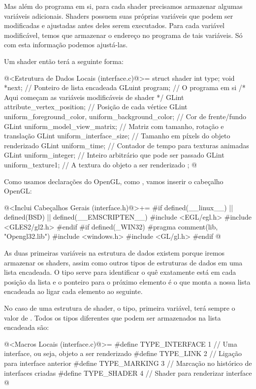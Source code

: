 Mas além do programa em si, para cada shader precisamos armazenar
algumas variáveis adicionais. Shaders possuem suas próprias variáveis
que podem ser modificadas e ajustadas antes deles serem
executados. Para cada variável modificável, temos que armazenar o
endereço no programa de tais variáveis. Só com esta informação podemos
ajustá-las.

Um shader então terá a seguinte forma:

\iniciocodigo
@<Estrutura de Dados Locais (interface.c)@>=
struct shader {
  int type;
  void *next; // Ponteiro de lista encadeada
  GLuint program; // O programa em si
  /* Aqui começam as variáveis modificáveis de shader */
  GLint attribute_vertex_position; // Posição de cada vértice
  GLint uniform_foreground_color, uniform_background_color; // Cor de frente/fundo
  GLint uniform_model_view_matrix; // Matriz com tamanho, rotação e translação
  GLint uniform_interface_size; // Tamanho em píxels do objeto renderizado
  GLint uniform_time; // Contador de tempo para texturas animadas
  GLint uniform_integer; // Inteiro arbitrário que pode ser passado
  GLint uniform_texture1; // A textura do objeto a ser renderizado
};
@
\fimcodigo

Como usamos declarações do OpenGL, como , vamos
inserir o cabeçalho OpenGL:

\iniciocodigo
@<Inclui Cabeçalhos Gerais (interface.h)@>+=
#if defined(__linux__) || defined(BSD) || defined(__EMSCRIPTEN__)
#include <EGL/egl.h>
#include <GLES2/gl2.h>
#endif
#if defined(_WIN32)
#pragma comment(lib, "Opengl32.lib")
#include <windows.h>
#include <GL/gl.h>
#endif
@
\fimcodigo


As duas primeiras variáveis na estrutura de dados existem porque
iremos armazenar os shaders, assim como outros tipos de estruturas de
dados em uma lista encadeada. O tipo serve para identificar o quê
exatamente está em cada posição da lista e o ponteiro para o próximo
elemento é o que monta a nossa lista encadeada ao ligar cada elemento
ao seguinte.

No caso de uma estrutura de shader, o tipo, primeira variável, terá
sempre o valor de . Todos os tipos diferentes
que podem ser armazenados na lista encadeada são:

\iniciocodigo
@<Macros Locais (interface.c)@>=
#define TYPE_INTERFACE 1 // Uma interface, ou seja, objeto a ser renderizado
#define TYPE_LINK      2 // Ligação para interface anterior
#define TYPE_MARKING   3 // Marcação no histórico de interfaces criadas
#define TYPE_SHADER    4 // Shader para renderizar interface
@
\fimcodigo

